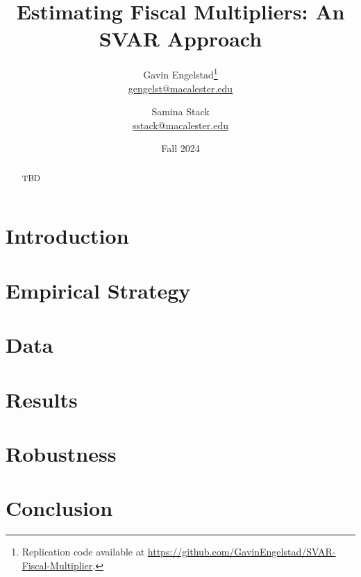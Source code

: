 \documentclass[11pt]{article}
\title{Estimating Fiscal Multipliers: An SVAR Approach}
\author{Gavin Engelstad\thanks{Replication code available at \url{https://github.com/GavinEngelstad/SVAR-Fiscal-Multiplier}.} \\ \href{mailto:gengelst@macalester.edu}{gengelst@macalester.edu} \and Samina Stack \\ \href{mailto:sstack@macalester.edu}{sstack@macalester.edu}}
\date{Fall 2024}
\numberwithin{equation}{section} %
\numberwithin{figure}{section} %
\numberwithin{table}{section} %
\begin{document}
\maketitle

\begin{abstract}
    TBD
\end{abstract}

\section{Introduction} \label{sec:intro}


% 

\section{Empirical Strategy} \label{sec:emp}


\section{Data} \label{sec:data}


\section{Results} \label{sec:results}


\section{Robustness} \label{sec:robust}


\section{Conclusion} \label{sec:concl}



\newpage
\printbibliography
\FloatBarrier
\end{document}
